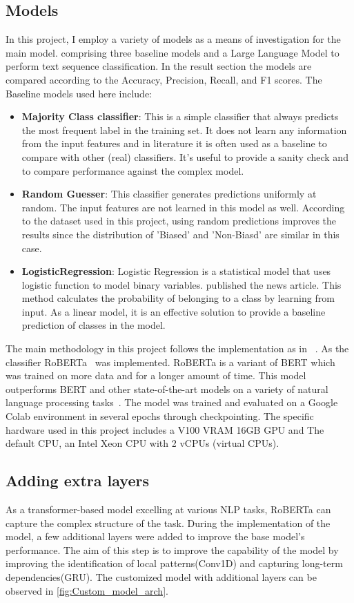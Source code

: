 \documentclass[11pt,a4paper]{article}
\begin{document}
\subsection{Models}
In this project, I employ a variety of models as a means of investigation for the main model. comprising three baseline models and a Large Language Model to perform text sequence classification. In the result section the models are compared according to the Accuracy, Precision, Recall, and F1 scores.
The Baseline models used here include:
\begin{itemize}
    \item \textbf{Majority Class classifier}: This is a simple classifier that always predicts the most frequent label in the training set. It does not learn any information from the input features and in literature it is often used as a baseline to compare with other (real) classifiers. It’s useful to provide a sanity check and to compare performance against the complex model.
    \item \textbf{Random Guesser}: This classifier generates predictions uniformly at random. The input features are not learned in this model as well. According to the dataset used in this project, using random predictions improves the results since the distribution of 'Biased' and 'Non-Biasd' are similar in this case. 
    \item \textbf{LogisticRegression}: Logistic Regression is a statistical model that uses logistic function to model binary variables. published the news article. This method calculates the probability of belonging to a class by learning from input. As a linear model, it is an effective solution to provide a baseline prediction of classes in the model.
\end{itemize}
The main methodology in this project follows the implementation as in ~\cite{spinde_2021_neural}. As the classifier RoBERTa~\cite{liu_2019_roberta} was implemented. RoBERTa is a variant of BERT which was trained on more data and for a longer amount of time. This model outperforms BERT and other state-of-the-art models on a variety of natural language processing tasks~\cite{a2020_overview}. The model was trained and evaluated on a Google Colab environment in several epochs through checkpointing. The specific hardware used in this project includes a V100 VRAM 16GB GPU and The default CPU, an Intel Xeon CPU with 2 vCPUs (virtual CPUs).

\subsection{Adding extra layers}
As a transformer-based model excelling at various NLP tasks, RoBERTa can capture the complex structure of the task. During the implementation of the model, a few additional layers were added to improve the base model's performance. The aim of this step is to improve the capability of the model by improving the identification of local patterns(Conv1D) and capturing long-term dependencies(GRU). The customized model with additional layers can be observed in \ref{fig:Custom_model_arch}.
\end{document}
